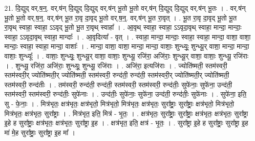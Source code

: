 \documentclass[17pt]{extarticle}
\begin{document}
21. दि॒द्युद् वर्.ष॒न्॒. वर्.ष॑न् दि॒द्युद् दि॒द्युद् वर्.ष॑न् भू॒तो भू॒तो वर्.ष॑न् दि॒द्युद् दि॒द्युद् वर्.ष॑न् भू॒तः । . वर्.ष॑न् भू॒तो भू॒तो वर्.ष॒न्॒. वर्.ष॑न् भू॒त रा॒वृ दा॒वृद् भू॒तो वर्.ष॒न्॒. वर्.ष॑न् भू॒त रा॒वृत् । . भू॒त रा॒वृ दा॒वृद् भू॒तो भू॒त रा॒वृथ् स्वाहा॒ स्वाहा॒ ऽऽवृद् भू॒तो भू॒त रा॒वृथ् स्वाहा᳚ । . आ॒वृथ् स्वाहा॒ स्वाहा॒ ऽऽवृदा॒वृथ् स्वाहा॒ मान्दा॒ मान्दाः॒ स्वाहा॒ ऽऽवृदा॒वृथ् स्वाहा॒ मान्दाः᳚ । . आ॒वृदित्या᳚ - वृत् । . स्वाहा॒ मान्दा॒ मान्दाः॒ स्वाहा॒ स्वाहा॒ मान्दा॒ वाशा॒ वाशा॒ मान्दाः॒ स्वाहा॒ स्वाहा॒ मान्दा॒ वाशाः᳚ । . मान्दा॒ वाशा॒ वाशा॒ मान्दा॒ मान्दा॒ वाशाः॒ शुन्ध्यूः॒ शुन्ध्यू॒र् वाशा॒ मान्दा॒ मान्दा॒ वाशाः॒ शुन्ध्यूः᳚ । . वाशाः॒ शुन्ध्यूः॒ शुन्ध्यू॒र् वाशा॒ वाशाः॒ शुन्ध्यू॒ रजि॑रा॒ अजि॑राः॒ शुन्ध्यू॒र् वाशा॒ वाशाः॒ शुन्ध्यू॒ रजि॑राः । . शुन्ध्यू॒ रजि॑रा॒ अजि॑राः॒ शुन्ध्यूः॒ शुन्ध्यू॒ रजि॑राः । . अजि॑रा॒ इत्यजि॑राः । . ज्योति॑ष्मती॒ स्तम॑स्वरी॒ स्तम॑स्वरी॒र् ज्योति॑ष्मती॒र् ज्योति॑ष्मती॒ स्तम॑स्वरी॒ रुन्द॑ती॒ रुन्द॑ती॒ स्तम॑स्वरी॒र् ज्योति॑ष्मती॒र् ज्योति॑ष्मती॒ स्तम॑स्वरी॒ रुन्द॑तीः । . तम॑स्वरी॒ रुन्द॑ती॒ रुन्द॑ती॒ स्तम॑स्वरी॒ स्तम॑स्वरी॒ रुन्द॑तीः॒ सुफे॑नाः॒ सुफे॑ना॒ उन्द॑ती॒ स्तम॑स्वरी॒ स्तम॑स्वरी॒ रुन्द॑तीः॒ सुफे॑नाः । . उन्द॑तीः॒ सुफे॑नाः॒ सुफे॑ना॒ उन्द॑ती॒ रुन्द॑तीः॒ सुफे॑नाः । . सुफे॑ना॒ इति॒ सु - फे॒नाः॒ । . मित्र॑भृतः॒ क्षत्र॑भृतः॒ क्षत्र॑भृतो॒ मित्र॑भृतो॒ मित्र॑भृतः॒ क्षत्र॑भृतः॒ सुरा᳚ष्ट्राः॒ सुरा᳚ष्ट्राः॒ क्षत्र॑भृतो॒ मित्र॑भृतो॒ मित्र॑भृतः॒ क्षत्र॑भृतः॒ सुरा᳚ष्ट्राः । . मित्र॑भृत॒ इति॒ मित्र॑ - भृ॒तः॒ । . क्षत्र॑भृतः॒ सुरा᳚ष्ट्राः॒ सुरा᳚ष्ट्राः॒ क्षत्र॑भृतः॒ क्षत्र॑भृतः॒ सुरा᳚ष्ट्रा इ॒हे ह सुरा᳚ष्ट्राः॒ क्षत्र॑भृतः॒ क्षत्र॑भृतः॒ सुरा᳚ष्ट्रा इ॒ह । . क्षत्र॑भृत॒ इति॒ क्षत्र॑ - भृ॒तः॒ । . सुरा᳚ष्ट्रा इ॒हे ह सुरा᳚ष्ट्राः॒ सुरा᳚ष्ट्रा इ॒ह मा॑ मे॒ह सुरा᳚ष्ट्राः॒ सुरा᳚ष्ट्रा इ॒ह मा᳚ । \newline
\end{document}
